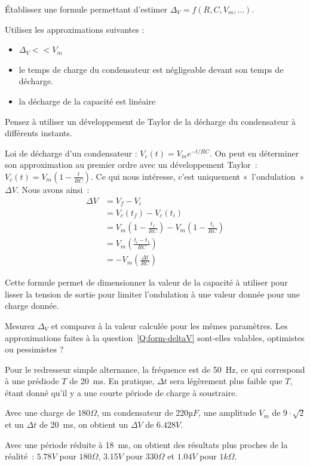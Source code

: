 \documentclass{../template/labo}
\begin{document}
\begin{predet}
\Question
{
	Établissez une formule permettant d'estimer $\Delta_V=f(R,C, V_m,\dots)$. %
	
	Utilisez les approximations suivantes :
	\begin{itemize}
	\item $\Delta_V<<V_m$
	\item le temps de charge du condensateur est négligeable devant son temps de décharge.
	\item la décharge de la capacité est linéaire
	\end{itemize}
	\begin{astuce}
		Pensez à utiliser un développement de Taylor de la décharge du condensateur à différents instants.
	\end{astuce}
	\label{Q:form-deltaV}
}
{
Loi de décharge d'un condensateur : $V_c(t) = V_m e^{-t/RC}$. On peut en déterminer son approximation au premier ordre avec un développement Taylor~: $V_c(t) = V_m (1-\frac{t}{RC})$.
Ce qui nous intéresse, c'est uniquement «~l'ondulation~» $\Delta V$.
Nous avons ainsi~: 
\begin{align*}
\Delta V & = V_f - V_i \\
& = V_c(t_f) - V_c(t_i) \\
& = V_m (1-\frac{t_f}{RC}) - V_m (1 - \frac{t_i}{RC})\\
& = V_m (\frac{t_i - t_f}{RC}) \\
& = - V_m (\frac{\Delta t}{RC})
\end{align*}
}%
	\label{Q:14}
\end{predet}

Cette formule permet de dimensionner la valeur de la capacité à utiliser pour lisser la tension de sortie pour limiter l'ondulation à une valeur donnée pour une charge donnée.

\begin{manip}
\Question
{
	Mesurez $\Delta_V$ et comparez à la valeur calculée pour les mêmes paramètres. Les approximations faites à la question~\ref{Q:form-deltaV} sont-elles valables, optimistes ou pessimistes ?
}
{
Pour le redresseur simple alternance, la fréquence est de 50~Hz, ce qui correspond à une prédiode $T$ de 20~ms.
En pratique, $\Delta t$ sera légèrement plus faible que $T$, étant donné qu'il y a une courte période de charge à soustraire.

Avec une charge de $180 \Omega$, un condensateur de $220 µF$, une amplitude $V_m$ de $9\cdot\sqrt{2}$ et un $\Delta t$ de 20~ms, on obtient un $\Delta V$ de $6.428 V$.

Avec une période réduite à 18~ms, on obtient des résultats plus proches de la réalité~: $5.78 V$ pour $180 \Omega$, $3.15 V$ pour $330 \Omega$ et $1.04 V$ pour $1 k\Omega$.

}%
	\label{Q:15}
\end{manip}
\end{document}
